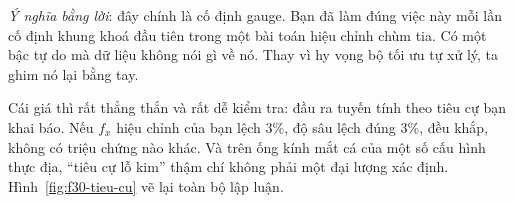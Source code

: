 \documentclass[../../deep_learning.tex]{subfiles}
\begin{document}
\emph{Ý nghĩa bằng lời}: đây chính là cố định gauge. Bạn đã làm đúng việc này mỗi lần cố định khung khoá đầu tiên trong một bài toán hiệu chỉnh chùm tia. Có một bậc tự do mà dữ liệu không nói gì về nó. Thay vì hy vọng bộ tối ưu tự xử lý, ta ghim nó lại bằng tay.

Cái giá thì rất thẳng thắn và rất dễ kiểm tra: đầu ra tuyến tính theo tiêu cự bạn khai báo. Nếu \(f_x\) hiệu chỉnh của bạn lệch 3\%, độ sâu lệch đúng 3\%, đều khắp, không có triệu chứng nào khác. Và trên ống kính mắt cá của một số cấu hình thực địa, ``tiêu cự lỗ kim'' thậm chí không phải một đại lượng xác định. Hình~\ref{fig:f30-tieu-cu} vẽ lại toàn bộ lập luận.
\end{document}
